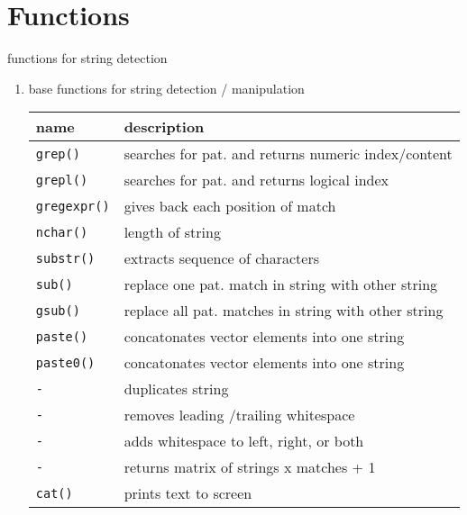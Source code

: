 \documentclass[ignorenonframetext,]{beamer}
\begin{document}
\section{Functions}\label{functions}

\begin{frame}[fragile]{functions for string detection}

\begin{enumerate}
\def\labelenumi{\arabic{enumi})}
\setcounter{enumi}{4}
\item
  base functions for string detection / manipulation

  \begin{longtable}[c]{@{}ll@{}}
  \toprule
  name & description\tabularnewline
  \midrule
  \endhead
  \texttt{grep()} & searches for pat. and returns numeric
  index/content\tabularnewline
  \texttt{grepl()} & searches for pat. and returns logical
  index\tabularnewline
  \texttt{gregexpr()} & gives back each position of match\tabularnewline
  \texttt{nchar()} & length of string\tabularnewline
  \texttt{substr()} & extracts sequence of characters\tabularnewline
  \texttt{sub()} & replace one pat. match in string with other
  string\tabularnewline
  \texttt{gsub()} & replace all pat. matches in string with other
  string\tabularnewline
  \texttt{paste()} & concatonates vector elements into one
  string\tabularnewline
  \texttt{paste0()} & concatonates vector elements into one
  string\tabularnewline
  \texttt{-} & duplicates string\tabularnewline
  \texttt{-} & removes leading /trailing whitespace\tabularnewline
  \texttt{-} & adds whitespace to left, right, or both\tabularnewline
  \texttt{-} & returns matrix of strings x matches + 1\tabularnewline
  \texttt{cat()} & prints text to screen\tabularnewline
  \bottomrule
  \end{longtable}
\end{enumerate}

\end{frame}
\end{document}
